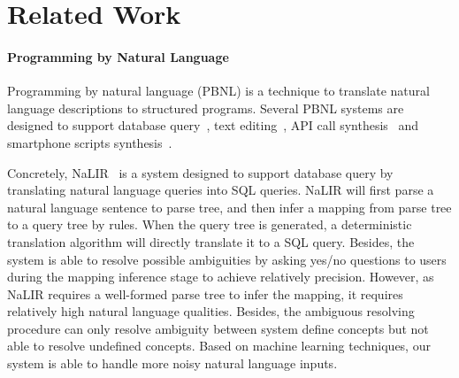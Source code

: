 \section{Related Work}


\paragraph{Programming by Natural Language} Programming by natural language (PBNL) is a technique to translate natural language descriptions to structured programs. Several PBNL systems are designed to support database query~\cite{DBLP:conf/sigmod/GulwaniM14, DBLP:journals/tods/LiYJ07, DBLP:journals/pvldb/LiJ14}, text editing~\cite{DBLP:journals/corr/DesaiGHJKMRR15}, API call synthesis~\cite{DBLP:journals/corr/RaghothamanWH15} and smartphone scripts synthesis~\cite{DBLP:conf/mobisys/LeGS13}.

Concretely, NaLIR~\cite{DBLP:journals/pvldb/LiJ14} is a system designed to support database query by translating natural language queries into SQL queries. NaLIR will first parse a natural language sentence to parse tree, and then infer a mapping from parse tree to a query tree by rules. When the query tree is generated, a deterministic translation algorithm will directly translate it to a SQL query. Besides, the system is able to resolve possible ambiguities by asking yes/no questions to users during the mapping inference stage to achieve relatively precision. However, as NaLIR requires a well-formed parse tree to infer the mapping, it requires relatively high natural language qualities. Besides, the ambiguous resolving procedure can only resolve ambiguity between system define concepts but not able to resolve undefined concepts. Based on machine learning techniques, our system is able to handle more noisy natural language inputs.

